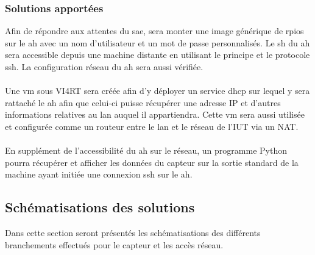 \documentclass[a4paper]{article}
\begin{document}
\subsubsection{Solutions apportées}
Afin de répondre aux attentes du \acrshort{sae}, sera monter une image générique de \gls{rpios}
 sur le \acrshort{ah} avec un nom d'utilisateur et un mot de passe personnalisés. Le \gls{sh} du \acrshort{ah} sera accessible depuis une machine distante en utilisant le principe et le protocole \gls{ssh}. La configuration réseau du \acrshort{ah} sera aussi vérifiée.\\\\Une \acrshort{vm} sous VI4RT sera créée afin d'y déployer un service \gls{dhcp} sur lequel y sera rattaché le \acrshort{ah} afin que celui-ci puisse récupérer une adresse IP et d'autres informations relatives au \gls{lan} auquel il appartiendra. Cette \acrshort{vm} sera aussi utilisée et configurée comme un routeur entre le \gls{lan} et le réseau de l'IUT via un NAT.\\\\En supplément de l'accessibilité du \acrshort{ah} sur le réseau, un programme Python pourra récupérer et afficher les données du capteur sur la sortie standard de la machine ayant initiée une connexion \gls{ssh} sur le \acrshort{ah}.
\subsection{Schématisations des solutions}
Dans cette section seront présentés les schématisations des différents branchements effectués pour le capteur et les accès réseau.
\newpage
\end{document}

